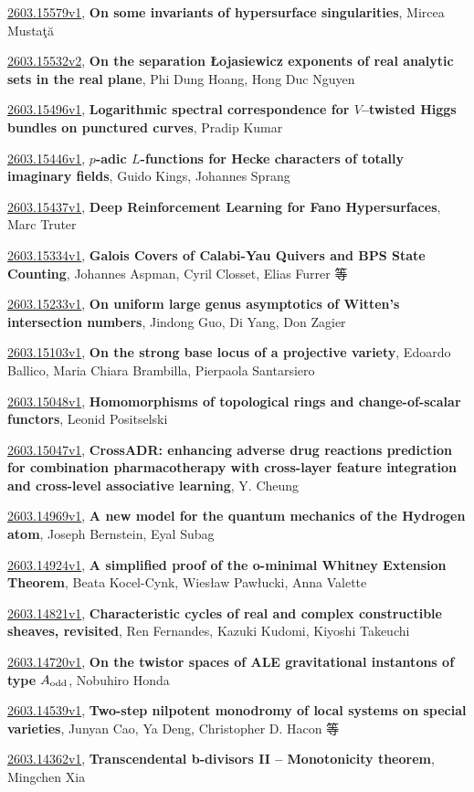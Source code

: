 \documentclass[9pt, a4paper]{article}
\theoremstyle{plain}
\theoremstyle{definition}
\theoremstyle{remark}
\newcommand{\arxiv}[3]{\href{https://arxiv.org/abs/#1}{#1}, \textbf{\textcolor{arxivblue}{#2}}, #3}
\begin{document}
\arxiv{2603.15579v1}{On some invariants of hypersurface singularities}{Mircea Mustaţă}

\arxiv{2603.15532v2}{On the separation Łojasiewicz exponents of real analytic sets in the real plane}{Phi Dung Hoang, Hong Duc Nguyen}

\arxiv{2603.15496v1}{Logarithmic spectral correspondence for $V$--twisted Higgs bundles on punctured curves}{Pradip Kumar}

\arxiv{2603.15446v1}{$p$-adic $L$-functions for Hecke characters of totally imaginary fields}{Guido Kings, Johannes Sprang}

\arxiv{2603.15437v1}{Deep Reinforcement Learning for Fano Hypersurfaces}{Marc Truter}

\arxiv{2603.15334v1}{Galois Covers of Calabi-Yau Quivers and BPS State Counting}{Johannes Aspman, Cyril Closset, Elias Furrer 等}

\arxiv{2603.15233v1}{On uniform large genus asymptotics of Witten's intersection numbers}{Jindong Guo, Di Yang, Don Zagier}

\arxiv{2603.15103v1}{On the strong base locus of a projective variety}{Edoardo Ballico, Maria Chiara Brambilla, Pierpaola Santarsiero}

\arxiv{2603.15048v1}{Homomorphisms of topological rings and change-of-scalar functors}{Leonid Positselski}

\arxiv{2603.15047v1}{CrossADR: enhancing adverse drug reactions prediction for combination pharmacotherapy with cross-layer feature integration and cross-level associative learning}{Y. Cheung}

\arxiv{2603.14969v1}{A new model for the quantum mechanics of the Hydrogen atom}{Joseph Bernstein, Eyal Subag}

\arxiv{2603.14924v1}{A simplified proof of the o-minimal Whitney Extension Theorem}{Beata Kocel-Cynk, Wiesław Pawłucki, Anna Valette}

\arxiv{2603.14821v1}{Characteristic cycles of real and complex constructible sheaves, revisited}{Ren Fernandes, Kazuki Kudomi, Kiyoshi Takeuchi}

\arxiv{2603.14720v1}{On the twistor spaces of ALE gravitational instantons of type $A_{\rm odd}$}{Nobuhiro Honda}

\arxiv{2603.14539v1}{Two-step nilpotent monodromy of local systems on special varieties}{Junyan Cao, Ya Deng, Christopher D. Hacon 等}

\arxiv{2603.14362v1}{Transcendental b-divisors II -- Monotonicity theorem}{Mingchen Xia}
\end{document}
